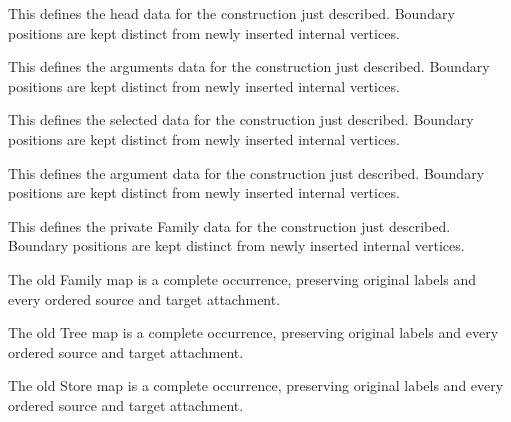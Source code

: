 This defines the head data for the construction just described. Boundary positions are kept distinct from newly inserted internal vertices.
\par{}

This defines the arguments data for the construction just described. Boundary positions are kept distinct from newly inserted internal vertices.
\par{}

This defines the selected data for the construction just described. Boundary positions are kept distinct from newly inserted internal vertices.
\par{}

This defines the argument data for the construction just described. Boundary positions are kept distinct from newly inserted internal vertices.
\par{}

This defines the private Family data for the construction just described. Boundary positions are kept distinct from newly inserted internal vertices.
\par{}

The old Family map is a complete occurrence, preserving original labels and every ordered source and target attachment.
\par{}

The old Tree map is a complete occurrence, preserving original labels and every ordered source and target attachment.
\par{}

The old Store map is a complete occurrence, preserving original labels and every ordered source and target attachment.
\par{}

